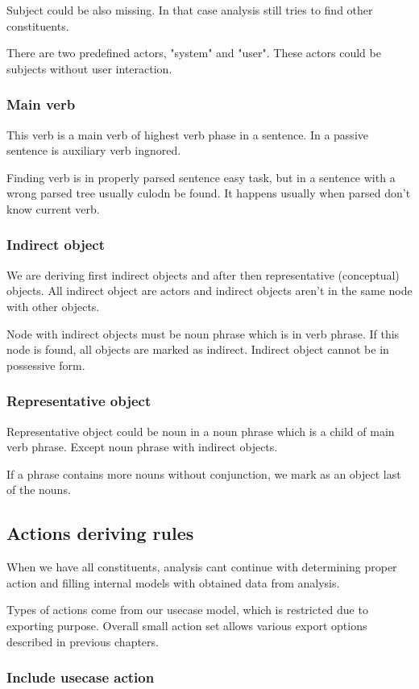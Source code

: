 Subject could be also missing. In that case analysis still tries to find other constituents.

There are two predefined actors, "system" and "user". These actors could be subjects without user interaction.

\subsubsection{Main verb}
This verb is a main verb of highest verb phase in a sentence. In a passive sentence is auxiliary verb ingnored. 

Finding verb is in properly parsed sentence easy task, but in a sentence with a wrong parsed tree usually culodn be found. It happens usually when parsed don't know current verb.

\subsubsection{Indirect object}
We are deriving first indirect objects and after then representative (conceptual) objects. All indirect object are actors and indirect objects aren't in the same node with other objects.

Node with indirect objects must be noun phrase which is in verb phrase. If this node is found, all objects are marked as indirect. Indirect object cannot be in possessive form.  


\subsubsection{Representative object}
Representative object could be noun in a noun phrase which is a child of main verb phrase. Except noun phrase with indirect objects.

If a phrase contains more nouns without conjunction, we mark as an object last of the nouns.

\subsection{Actions deriving rules}
When we have all constituents, analysis cant continue with determining proper action and filling internal models with obtained data from analysis.

Types of actions come from our usecase model, which is restricted due to exporting purpose. Overall small action set allows various export options described in previous chapters.

\subsubsection{Include usecase action}


